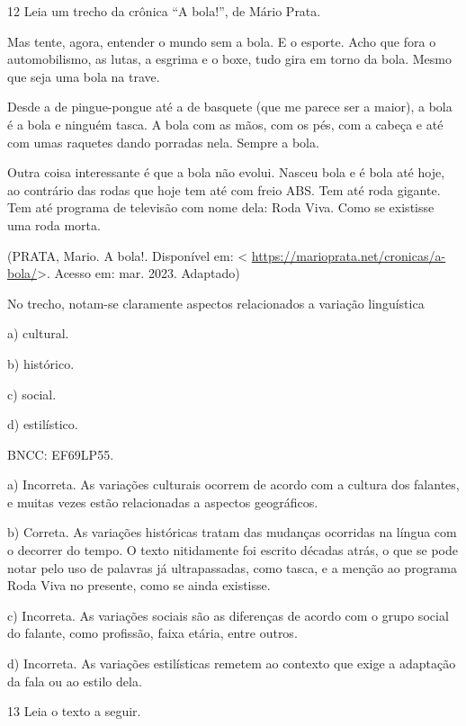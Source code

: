 \num{12} Leia um trecho da crônica ``A bola!'', de Mário Prata.

Mas tente, agora, entender o mundo sem a bola. E o esporte. Acho que
fora o automobilismo, as lutas, a esgrima e o boxe, tudo gira em torno
da bola. Mesmo que seja uma bola na trave.

Desde a de pingue-pongue até a de basquete (que me parece ser a maior),
a bola é a bola e ninguém tasca. A bola com as mãos, com os pés, com a
cabeça e até com umas raquetes dando porradas nela. Sempre a bola.

Outra coisa interessante é que a bola não evolui. Nasceu bola e é bola
até hoje, ao contrário das rodas que hoje tem até com freio ABS. Tem até
roda gigante. Tem até programa de televisão com nome dela: Roda Viva.
Como se existisse uma roda morta.

(PRATA, Mario. A bola!. Disponível em: \textless{}
\url{https://marioprata.net/cronicas/a-bola/}\textgreater. Acesso em:
mar. 2023. Adaptado)

No trecho, notam-se claramente aspectos relacionados a variação
linguística

a) cultural.

b) histórico.

c) social.

d) estilístico.

BNCC: EF69LP55.

a) Incorreta. As variações culturais ocorrem de acordo com a cultura dos
falantes, e muitas vezes estão relacionadas a aspectos geográficos.

b) Correta. As variações históricas tratam das mudanças ocorridas na
língua com o decorrer do tempo. O texto nitidamente foi escrito décadas
atrás, o que se pode notar pelo uso de palavras já ultrapassadas, como
tasca, e a menção ao programa Roda Viva no presente, como se ainda
existisse.

c) Incorreta. As variações sociais são as diferenças de acordo com o
grupo social do falante, como profissão, faixa etária, entre outros.

d) Incorreta. As variações estilísticas remetem ao contexto que exige a
adaptação da fala ou ao estilo dela.

\num{13} Leia o texto a seguir.

